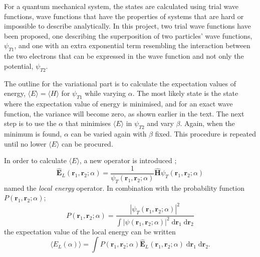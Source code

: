 \documentclass[a4paper,11pt]{article}
\newcommand{\diff}{\ensuremath{\; \text{d}}}
\begin{document}
    For a quantum mechanical system, the states are calculated using trial wave functions, wave functions that have the properties of systems that are hard or impossible to describe analytically. In this project, two trial wave functions have been proposed, one describing the superposition of two particles' wave functions, $\psi_{T1}$, and one with an extra exponential term resembling the interaction between the two electrons that can be expressed in the wave function and not only the potential, $\psi_{T2}$.

    The outline for the variational part is to calculate the expectation values of energy, $\langle E \rangle = \langle H \rangle$ for $\psi_{T1}$ while varying $\alpha$. The most likely state is the state where the expectation value of energy is minimised, and for an exact wave function, the variance will become zero, as shown earlier in the text. The next step is to use the $\alpha$ that minimises $\langle E \rangle$ in $\psi_{T2}$ and vary $\beta$. Again, when the minimum is found, $\alpha$ can be varied again with $\beta$ fixed. This procedure is repeated until no lower $\langle E \rangle$ can be procured.

    In order to calculate $\langle E \rangle$, a new operator is introduced \cite{MHJ:2013};
    \begin{equation}
        \hat{\mathbf{E}}_L (\mathbf{r}_1, \mathbf{r}_2; \alpha) = \frac{1}{\psi_T\left( \mathbf{r}_1, \mathbf{r}_2; \alpha \right)} \hat{\mathbf{H}} \psi_T\left( \mathbf{r}_1, \mathbf{r}_2; \alpha \right)
        \label{eq:locerg}
    \end{equation}
    named the \textit{local energy} operator. In combination with the probability function $P\left( \mathbf{r}_1, \mathbf{r}_2; \alpha \right)$;
    \begin{equation}
        P\left( \mathbf{r}_1, \mathbf{r}_2; \alpha \right) = \frac{|\psi_T\left( \mathbf{r}_1, \mathbf{r}_2; \alpha \right)|^2}{\int |\psi(\mathbf{r}_1, \mathbf{r}_2; \alpha)|^2 \diff \mathbf{r}_1 \diff \mathbf{r}_2}
    \label{eq:probfunc}
    \end{equation}
    the expectation value of the local energy can be written
    \begin{equation}
        \langle E_L(\alpha) \rangle = \int P(\mathbf{r}_1, \mathbf{r}_2; \alpha) \hat{\mathbf{E}}_L\left( \mathbf{r}_1, \mathbf{r}_2; \alpha \right) \diff \mathbf{r}_1 \diff \mathbf{r}_2.
        \label{eq:expval_locerg}
    \end{equation}
\end{document}

